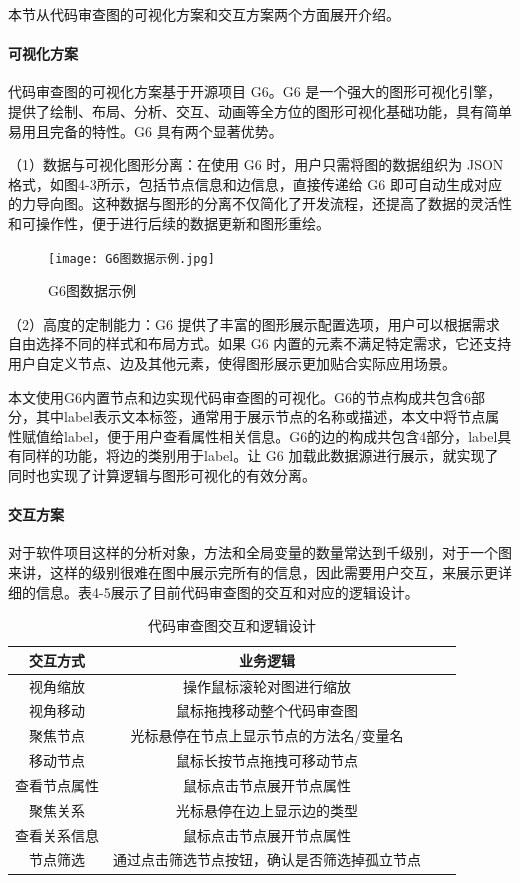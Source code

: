 本节从代码审查图的可视化方案和交互方案两个方面展开介绍。

\paragraph{可视化方案}

代码审查图的可视化方案基于开源项目 G6。G6 是一个强大的图形可视化引擎，提供了绘制、布局、分析、交互、动画等全方位的图形可视化基础功能，具有简单易用且完备的特性。G6 具有两个显著优势。

（1）数据与可视化图形分离：在使用 G6 时，用户只需将图的数据组织为 JSON 格式，如图4-3所示，包括节点信息和边信息，直接传递给 G6 即可自动生成对应的力导向图。这种数据与图形的分离不仅简化了开发流程，还提高了数据的灵活性和可操作性，便于进行后续的数据更新和图形重绘。

\begin{figure}[h]
\centering
\texttt{[image: G6图数据示例.jpg]}
\caption{G6图数据示例}
\end{figure}

（2）高度的定制能力：G6 提供了丰富的图形展示配置选项，用户可以根据需求自由选择不同的样式和布局方式。如果 G6 内置的元素不满足特定需求，它还支持用户自定义节点、边及其他元素，使得图形展示更加贴合实际应用场景。

本文使用G6内置节点和边实现代码审查图的可视化。G6的节点构成共包含6部分，其中label表示文本标签，通常用于展示节点的名称或描述，本文中将节点属性赋值给label，便于用户查看属性相关信息。G6的边的构成共包含4部分，label具有同样的功能，将边的类别用于label。让 G6 加载此数据源进行展示，就实现了同时也实现了计算逻辑与图形可视化的有效分离。


\paragraph{交互方案}

对于软件项目这样的分析对象，方法和全局变量的数量常达到千级别，对于一个图来讲，这样的级别很难在图中展示完所有的信息，因此需要用户交互，来展示更详细的信息。表4-5展示了目前代码审查图的交互和对应的逻辑设计。


\begin{table}[htbp]
\caption{代码审查图交互和逻辑设计}
\vspace{0.5em}\centering\wuhao
\begin{tabular}{cccc}
\toprule
交互方式 & 业务逻辑 \\
\midrule
视角缩放 & 操作鼠标滚轮对图进行缩放  \\
视角移动 & 鼠标拖拽移动整个代码审查图   \\
聚焦节点 & 光标悬停在节点上显示节点的方法名/变量名  \\
移动节点 & 鼠标长按节点拖拽可移动节点 \\
查看节点属性 & 鼠标点击节点展开节点属性  \\
聚焦关系 & 光标悬停在边上显示边的类型  \\
查看关系信息 & 鼠标点击节点展开节点属性  \\
节点筛选 & 通过点击筛选节点按钮，确认是否筛选掉孤立节点 \\
\bottomrule
\end{tabular}
\end{table}


